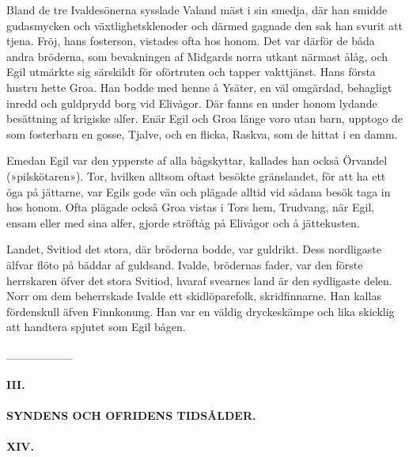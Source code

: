 Bland de tre Ivaldesönerna sysslade Valand mäst i sin smedja, där han
smidde gudasmycken och växtlighetsklenoder och därmed gagnade den sak
han svurit att tjena. Fröj, hans fosterson, vistades ofta hos honom. Det
var därför de båda andra bröderna, som bevakningen af Midgards norra
utkant närmast ålåg, och Egil utmärkte sig särskildt för oförtruten och
tapper vakttjänst. Hans första hustru hette Groa. Han bodde med henne å
Ysäter, en väl omgärdad, behagligt inredd och guldprydd borg vid
Elivågor. Där fanns en under honom lydande besättning af krigiske alfer.
Enär Egil och Groa länge voro utan barn, upptogo de som fosterbarn en
gosse, Tjalve, och en flicka, Raskva, som de hittat i en damm.

Emedan Egil var den ypperste af alla bågskyttar, kallades han också
Örvandel (»pilskötaren»). Tor, hvilken alltsom oftast besökte
gränslandet, för att ha ett öga på jättarne, var Egils gode vän och
plägade alltid vid sådana besök taga in hos honom. Ofta plägade också
Groa vistas i Tors hem, Trudvang, när Egil, ensam eller med sina alfer,
gjorde ströftåg på Elivågor och å jättekusten.

Landet, Svitiod det stora, där bröderna bodde, var guldrikt. Dess
nordligaste älfvar flöto på bäddar af guldsand. Ivalde, brödernas fader,
var den förste herrskaren öfver det stora Svitiod, hvaraf svearnes land
är den sydligaste delen. Norr om dem beherrskade Ivalde ett
skidlöparefolk, skridfinnarne. Han kallas fördenskull äfven Finnkonung.
Han var en väldig dryckeskämpe och lika skicklig att handtera spjutet
som Egil bågen.

{\_\_\_\_\_\_\_\_}

\protect\hypertarget{lb1625905.xhtmlux5cux23start38}{}{}\protect\hypertarget{lb1625905.xhtmlux5cux23start38-a}{}{}\protect\hypertarget{lb1625905.xhtmlux5cux23start38-b}{}{}\protect\hypertarget{lb1625905.xhtmlux5cux23start38-c}{}{}\protect\hypertarget{lb1625905.xhtmlux5cux23start38-d}{}{}

\paragraph{III.}

\paragraph{SYNDENS OCH OFRIDENS TIDSÅLDER.}

\paragraph{XIV.}

